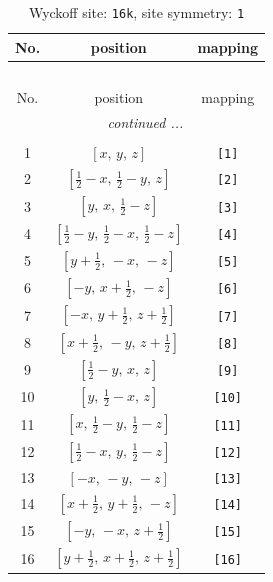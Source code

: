 \documentclass[fleqn,8pt]{jsarticle}
\begin{document}
\begin{longtable}{ccc}
\caption{Wyckoff site: {\tt 16k}, site symmetry: {\tt 1}}
 \\
 \hline \hline
No. & position & mapping \\ \hline \endfirsthead

\multicolumn{2}{l}{\tablename\ \thetable{}} \\
 \hline \hline
No. & position & mapping \\ \hline \endhead

 \hline \hline
\multicolumn{2}{r}{\footnotesize\it continued ...} \\ \endfoot

 \hline \hline
\multicolumn{2}{r}{} \\ \endlastfoot

1 & $\left[ x,\, y,\, z \right]$ & {\tt [1]} \\ \hline
2 & $\left[ \frac{1}{2} - x,\, \frac{1}{2} - y,\, z \right]$ & {\tt [2]} \\ \hline
3 & $\left[ y,\, x,\, \frac{1}{2} - z \right]$ & {\tt [3]} \\ \hline
4 & $\left[ \frac{1}{2} - y,\, \frac{1}{2} - x,\, \frac{1}{2} - z \right]$ & {\tt [4]} \\ \hline
5 & $\left[ y + \frac{1}{2},\, - x,\, - z \right]$ & {\tt [5]} \\ \hline
6 & $\left[ - y,\, x + \frac{1}{2},\, - z \right]$ & {\tt [6]} \\ \hline
7 & $\left[ - x,\, y + \frac{1}{2},\, z + \frac{1}{2} \right]$ & {\tt [7]} \\ \hline
8 & $\left[ x + \frac{1}{2},\, - y,\, z + \frac{1}{2} \right]$ & {\tt [8]} \\ \hline
9 & $\left[ \frac{1}{2} - y,\, x,\, z \right]$ & {\tt [9]} \\ \hline
10 & $\left[ y,\, \frac{1}{2} - x,\, z \right]$ & {\tt [10]} \\ \hline
11 & $\left[ x,\, \frac{1}{2} - y,\, \frac{1}{2} - z \right]$ & {\tt [11]} \\ \hline
12 & $\left[ \frac{1}{2} - x,\, y,\, \frac{1}{2} - z \right]$ & {\tt [12]} \\ \hline
13 & $\left[ - x,\, - y,\, - z \right]$ & {\tt [13]} \\ \hline
14 & $\left[ x + \frac{1}{2},\, y + \frac{1}{2},\, - z \right]$ & {\tt [14]} \\ \hline
15 & $\left[ - y,\, - x,\, z + \frac{1}{2} \right]$ & {\tt [15]} \\ \hline
16 & $\left[ y + \frac{1}{2},\, x + \frac{1}{2},\, z + \frac{1}{2} \right]$ & {\tt [16]} \\
\end{longtable}
\end{document}
